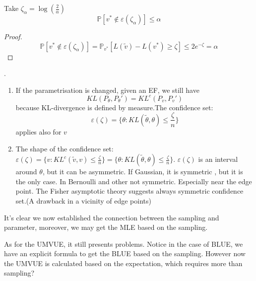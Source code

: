 \begin{corollary}
	Take $\zeta_\alpha = \log (\frac{2}{\alpha})$
	\begin{equation*}
		\mathbb{P}[ v^* \notin \varepsilon(\zeta_\alpha)] \leq \alpha
	\end{equation*}
\end{corollary}

\begin{proof}
	\begin{equation*}
		\mathbb{P}[ v^* \notin \varepsilon(\zeta_\alpha)] = \mathbb{P}_{v^*} [L(\tilde{v}) - L(v^*) \geq \zeta] \leq 2 e^{-\zeta} = \alpha
	\end{equation*}
\end{proof}

\begin{remark}.
\begin{enumerate}
	\item If the parametrisation is changed, given an EF, we still have
		\begin{equation*}
				KL(P_\theta, P_\theta') = KL^c(P_v, P_v')
		\end{equation*}
		because KL-divergence is defined by measure.The confidence set:
		\begin{equation*}
			\varepsilon(\zeta) = \{\theta : KL(\tilde{\theta}, \theta ) \leq \frac{\zeta}{n} \}
		\end{equation*}
		applies also for $v$
	\item The shape of the confidence set:$\varepsilon(\zeta) = \{v : KL^c(\tilde{v}, v) \leq \frac{\zeta}{n} \} = \{\theta : KL(\tilde{\theta}, \theta ) \leq \frac{\zeta}{n} \}$. $\varepsilon(\zeta)$ is an interval around $\theta$, but it can be asymmetric.
If Gaussian, it is symmetric , but it is the only case. In Bernoulli and other not symmetric. Especially near the edge point. The Fisher asymptotic theory suggests always symmetric confidence set.(A drawback in a vicinity of edge points)
\end{enumerate}	
\end{remark}






It's clear we now established the connection between the sampling and parameter, moreover, we may get the MLE based on the sampling. \par 
As for the UMVUE, it still presents problems. Notice in the case of BLUE, we have an explicit formula to get the BLUE based on the sampling. However now the UMVUE is calculated based on the expectation, which requires more than sampling?\par 

